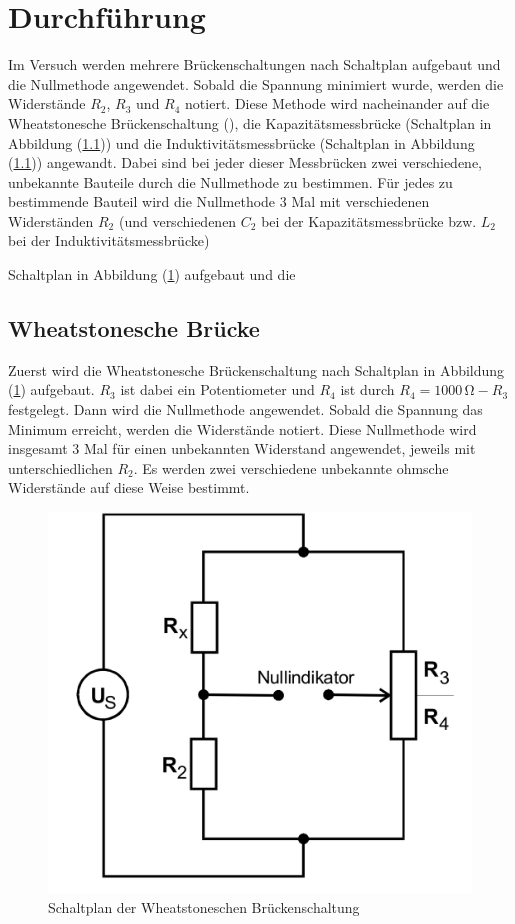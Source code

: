 \section{Durchführung}
Im Versuch werden mehrere Brückenschaltungen nach Schaltplan aufgebaut und die Nullmethode angewendet. Sobald die Spannung minimiert wurde, werden 
die Widerstände $R_2$, $R_3$ und $R_4$ notiert. Diese Methode wird nacheinander auf die Wheatstonesche Brückenschaltung (), die Kapazitätsmessbrücke (Schaltplan in Abbildung (\ref{})) und die Induktivitätsmessbrücke (Schaltplan 
in Abbildung (\ref{})) angewandt. Dabei sind bei jeder dieser Messbrücken zwei verschiedene, unbekannte Bauteile durch die Nullmethode zu bestimmen. Für jedes
zu bestimmende Bauteil wird die Nullmethode 3 Mal mit verschiedenen Widerständen $R_2$ (und verschiedenen $C_2$ bei der Kapazitätsmessbrücke bzw. $L_2$ bei der
Induktivitätsmessbrücke)

Schaltplan in Abbildung (\ref{pic:Wheatstonesche_Brückenschaltung}) aufgebaut und die 
\subsection{Wheatstonesche Brücke}
Zuerst wird die Wheatstonesche Brückenschaltung nach Schaltplan in Abbildung (\ref{pic:Wheatstonesche_Brückenschaltung}) aufgebaut. $R_3$ ist dabei ein Potentiometer
und $R_4$ ist durch $R_4 = 1000 \, \unit{\ohm} - R_3 $ festgelegt. Dann wird die Nullmethode angewendet.
Sobald die Spannung das Minimum erreicht, werden die Widerstände notiert. Diese Nullmethode wird insgesamt 3 Mal für einen unbekannten Widerstand angewendet, jeweils
mit unterschiedlichen $R_2$. Es werden zwei verschiedene unbekannte ohmsche Widerstände auf diese Weise bestimmt.  
\begin{figure}[H]
    \centering
    \includegraphics[width=0.4\linewidth]{Wheatstonesche.png}
    \caption{Schaltplan der Wheatstoneschen Brückenschaltung}
    \label{pic:Wheatstonesche_Brückenschaltung}
\end{figure}
